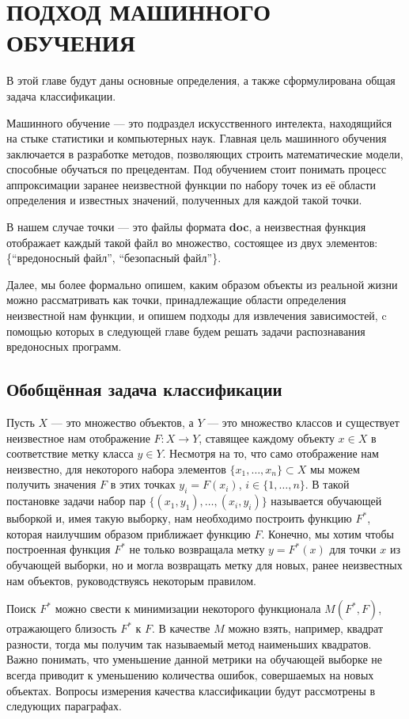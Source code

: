 \chapter{ПОДХОД МАШИННОГО ОБУЧЕНИЯ}

В этой главе будут даны основные определения, а также  сформулирована общая задача классификации.

Машинного обучение — это подраздел искусственного интелекта, находящийся на стыке статистики и компьютерных наук. Главная цель машинного обучения заключается в разработке методов, позволяющих строить математические модели, способные обучаться по прецедентам. Под обучением стоит понимать процесс аппроксимации заранее неизвестной функции по набору точек из её области определения и известных значений, полученных для каждой такой точки.

В нашем случае точки — это файлы формата \textbf{doc}, а неизвестная функция отображает каждый такой файл во множество, состоящее из двух элементов: \{“вредоносный файл”, “безопасный файл”\}.

Далее, мы более формально опишем, каким образом объекты  из реальной жизни можно рассматривать как точки, принадлежащие области определения неизвестной нам функции, и опишем подходы для извлечения зависимостей, c помощью которых в следующей главе будем решать задачи распознавания вредоносных программ.

\section{Обобщённая задача классификации}

Пусть $X$ — это множество объектов, а $Y$ — это множество классов и существует неизвестное нам отображение $F : X \to Y$, ставящее каждому объекту $x \in X$ в соответствие метку класса $y \in Y$.
Несмотря на то, что само отображение нам неизвестно, для некоторого набора элементов $\{ x_1, \dots , x_n \} \subset X$ мы можем получить значения $F$ в этих точках  $y_i = F(x_i)$, $i \in \{ 1, \dots, n \}$.
В такой постановке задачи набор пар $\{ (x_1, y_1), \dots, (x_i, y_i) \}$ называется обучающей выборкой и, имея такую выборку, нам необходимо построить функцию $F^*$, которая наилучшим образом приближает функцию $F$.
Конечно, мы хотим чтобы построенная функция $F^*$ не только возвращала метку $y = F^*(x)$ для точки $x$ из обучающей выборки, но и могла возвращать метку для новых, ранее неизвестных нам объектов, руководствуясь некоторым правилом.

Поиск $F^*$ можно свести к минимизации некоторого функционала $M(F^*, F)$, отражающего близость $F^*$ к $F$. В качестве $M$ можно взять, например, квадрат разности, тогда мы получим так называемый метод наименьших квадратов. Важно понимать, что уменьшение данной метрики на обучающей выборке не всегда приводит к уменьшению количества ошибок, совершаемых на новых объектах. Вопросы измерения качества классификации будут рассмотрены в следующих параграфах.

